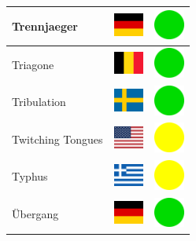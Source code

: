 \documentclass[12pt, a4paper, twoside]{report}
\begin{document}
\begin{center}
\begin{longtable}{|p{5cm}|p{2cm}|p{2cm}|}
 Trennjaeger                                                & \includegraphics[width=1cm]{4x3/de} &   \includegraphics[width=1cm]{likes/y} \\ \hline
 Triagone                                                   & \includegraphics[width=1cm]{4x3/be} &   \includegraphics[width=1cm]{likes/y} \\ \hline
 Tribulation                                                & \includegraphics[width=1cm]{4x3/se} &   \includegraphics[width=1cm]{likes/y} \\ \hline
 Twitching Tongues                                          & \includegraphics[width=1cm]{4x3/us} &   \includegraphics[width=1cm]{likes/m} \\ \hline
 Typhus                                                     & \includegraphics[width=1cm]{4x3/gr} &   \includegraphics[width=1cm]{likes/m} \\ \hline
 Übergang                                                   & \includegraphics[width=1cm]{4x3/de} &   \includegraphics[width=1cm]{likes/y} \\ \hline

\end{longtable}
\end{center}
\end{document}
